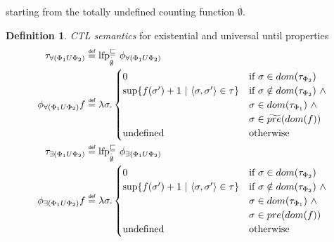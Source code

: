 \documentclass[11pt,a4paper,titlepage]{article}
\theoremstyle{definition}
\newtheorem{definition}{Definition}[section]
\newcommand\eqdef{\mathrel{\overset{\makebox[0pt]{\mbox{\normalfont\tiny\sffamily def}}}{=}}}
\begin{document}
starting from the totally undefined counting function $\overset{.}{\emptyset}$.

\begin{definition}\label{def:ctl_semantics_until}
    \textit{CTL semantics} for existential and universal \textsf{until} properties
    \setlength{\jot}{15pt}
    \begin{align}
        \tau_{\forall(\Phi_1 U \Phi_2)}  &\eqdef \text{lfp}_{\overset{.}{\emptyset}}^{\sqsubseteq} \ \phi_{\forall(\Phi_1 U \Phi_2)}\\
        \phi_{\forall(\Phi_1 U \Phi_2)}f &\eqdef \lambda \sigma.
        \begin{cases}
            0                                                           
                & \text{if} \ \sigma \in dom(\tau_{\Phi_2}) \\
            \sup\{ f(\sigma') + 1 \ | \ \langle \sigma,\sigma' \rangle \in \tau \}    
                & \text{if} \ \sigma \notin dom(\tau_{\Phi_2}) \ \land \\ 
                & \sigma \in dom(\tau_{\Phi_1}) \ \land \\ 
                & \sigma \in \widetilde{pre}(dom(f)) \\
            \text{undefined}                                            
                & \text{otherwise}
        \end{cases}\\
        \tau_{\exists(\Phi_1 U \Phi_2)}  &\eqdef \text{lfp}_{\overset{.}{\emptyset}}^{\sqsubseteq} \ \phi_{\exists(\Phi_1 U \Phi_2)}\\
        \phi_{\exists(\Phi_1 U \Phi_2)}f &\eqdef \lambda \sigma.
        \begin{cases}
            0                                                           
                & \text{if} \ \sigma \in dom(\tau_{\Phi_2}) \\
            \sup\{ f(\sigma') + 1 \ | \ \langle \sigma,\sigma' \rangle \in \tau \}    
                & \text{if} \ \sigma \notin dom(\tau_{\Phi_2}) \ \land \\ 
                & \sigma \in dom(\tau_{\Phi_1}) \ \land \\ 
                & \sigma \in pre(dom(f)) \\
            \text{undefined}                                            
                & \text{otherwise}
        \end{cases}
    \end{align}
\end{definition}
\end{document}
